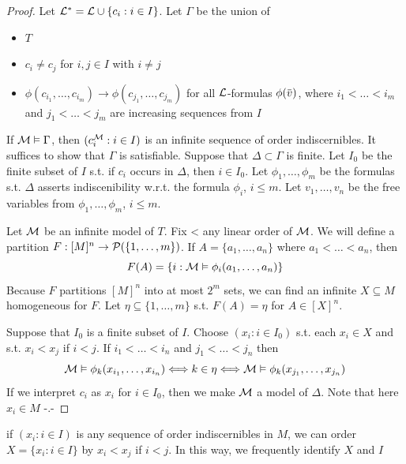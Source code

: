 \documentclass[11pt]{article}
\begin{document}
\begin{proof}
Let \(\mathcal{L}^*=\mathcal{L}\cup\{c_i:i\in I\}\). Let \(\Gamma\) be the union of
\begin{itemize}
\item \(T\)
\item \(c_i\neq c_j\) for \(i,j\in I\) with \(i\neq j\)
\item \(\phi(c_{i_1},\dots,c_{i_m})\to\phi(c_{j_1},\dots,c_{j_m})\) for all \(\mathcal{L}\)-formulas \(\phi(\barv)\),
where \(i_1<\dots<i_m\) and \(j_1<\dots<j_m\) are increasing sequences from \(I\)
\end{itemize}


If \(\mathcal{M}\vDash\Gamma\), then \((c_i^{\mathcal{M}}:i\in I)\) is an infinite sequence of order indiscernibles. It suffices
to show that \(\Gamma\) is satisfiable. Suppose that \(\Delta\subset\Gamma\) is finite. Let \(I_0\) be the finite subset
of \(I\) s.t. if \(c_i\) occurs in \(\Delta\), then \(i\in I_0\). Let \(\phi_1,\dots,\phi_m\) be the formulas s.t.
\(\Delta\) asserts indiscenibility w.r.t. the formula \(\phi_i\), \(i\le m\). Let \(v_1,\dots,v_n\) be the free
variables from \(\phi_1,\dots,\phi_m\), \(i\le m\).

 Let \(\mathcal{M}\) be an infinite model of \(T\). Fix < any linear order of \(\mathcal{M}\). We will define a
partition \(F:[M]^n\to\mathcal{P}(\{1,\dots,m\})\). If \(A=\{a_1,\dots,a_n\}\) where \(a_1<\dots<a_n\), then
\begin{equation*}
F(A)=\{i:\mathcal{M}\vDash\phi_i(a_1,\dots,a_n)\}
\end{equation*}
Because \(F\) partitions \([M]^n\) into at most \(2^m\) sets, we can find an
infinite \(X\subseteq M\) homogeneous for \(F\). Let \(\eta\subseteq\{1,\dots,m\}\) s.t. \(F(A)=\eta\) for \(A\in[X]^n\).

Suppose that \(I_0\) is a finite subset of \(I\). Choose \((x_i:i\in I_0)\) s.t. each \(x_i\in X\) and
s.t. \(x_i<x_j\) if \(i<j\). If \(i_1<\dots<i_n\) and \(j_1<\dots<j_n\) then
\begin{equation*}
\mathcal{M}\vDash\phi_k(x_{i_1},\dots,x_{i_n})\Longleftrightarrow k\in\eta\Longleftrightarrow\mathcal{M}\vDash\phi_k(x_{j_1},\dots,x_{j_n})
\end{equation*}
If we interpret \(c_i\) as \(x_i\) for \(i\in I_0\), then we make \(\mathcal{M}\) a model of \(\Delta\). Note that
here \(x_i\in M\) -.-
\end{proof}

if \((x_i:i\in I)\) is any sequence of order indiscernibles in \(M\), we can order \(X=\{x_i:i\in I\}\)
by \(x_i<x_j\) if \(i<j\). In this way, we frequently identify \(X\) and \(I\)
\end{document}

